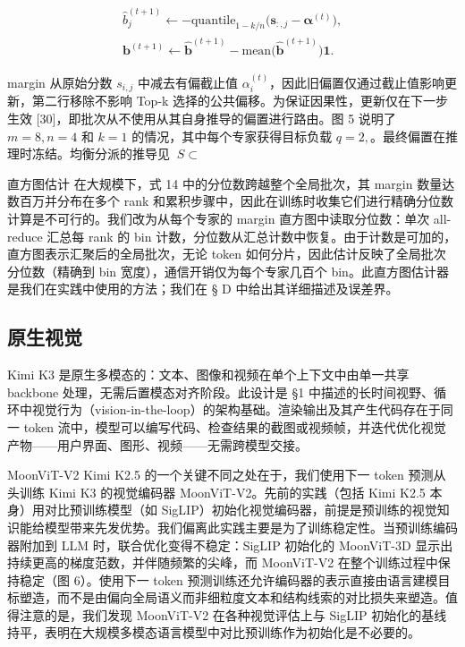 \documentclass[
  10
]{article}
\begin{document}
\[
\begin{array}{l} \widehat {b} _ {j} ^ {(t + 1)} \leftarrow - \text {quantile} _ {1 - k / n} \Big (\boldsymbol {s} _ {:, j} - \boldsymbol {\alpha} ^ {(t)} \Big), \\ \boldsymbol {b} ^ {(t + 1)} \leftarrow \widehat {\boldsymbol {b}} ^ {(t + 1)} - \text {mean} \Big (\widehat {\boldsymbol {b}} ^ {(t + 1)} \Big)   \mathbf {1}. \end{array}\tag{14}
\]

margin 从原始分数 \(s _ { i , j }\) 中减去有偏截止值 \(\alpha _ { i } ^ { ( t ) }\)，因此旧偏置仅通过截止值影响更新，第二行移除不影响 Top-k 选择的公共偏移。为保证因果性，更新仅在下一步生效 {[}30{]}，即批次从不使用从其自身推导的偏置进行路由。图 5 说明了 \(m = 8 , n = 4\) 和 \(k = 1\) 的情况，其中每个专家获得目标负载 \(q = 2 ,\)。最终偏置在推理时冻结。均衡分派的推导见 \(\ S \subset\)

直方图估计 在大规模下，式 14 中的分位数跨越整个全局批次，其 margin 数量达数百万并分布在多个 rank 和累积步骤中，因此在训练时收集它们进行精确分位数计算是不可行的。我们改为从每个专家的 margin 直方图中读取分位数：单次 all-reduce 汇总每 rank 的 bin 计数，分位数从汇总计数中恢复。由于计数是可加的，直方图表示汇聚后的全局批次，无论 token 如何分片，因此估计反映了全局批次分位数（精确到 bin 宽度），通信开销仅为每个专家几百个 bin。此直方图估计器是我们在实践中使用的方法；我们在 § D 中给出其详细描述及误差界。

\subsection{原生视觉}\label{native-vision}

Kimi K3 是原生多模态的：文本、图像和视频在单个上下文中由单一共享 backbone 处理，无需后置模态对齐阶段。此设计是 §1 中描述的长时间视野、循环中视觉行为（vision-in-the-loop）的架构基础。渲染输出及其产生代码存在于同一 token 流中，模型可以编写代码、检查结果的截图或视频帧，并迭代优化视觉产物——用户界面、图形、视频——无需跨模型交接。

MoonViT-V2 Kimi K2.5 的一个关键不同之处在于，我们使用下一 token 预测从头训练 Kimi K3 的视觉编码器 MoonViT-V2。先前的实践（包括 Kimi K2.5 本身）用对比预训练模型（如 SigLIP）初始化视觉编码器，前提是预训练的视觉知识能给模型带来先发优势。我们偏离此实践主要是为了训练稳定性。当预训练编码器附加到 LLM 时，联合优化变得不稳定：SigLIP 初始化的 MoonViT-3D 显示出持续更高的梯度范数，并伴随频繁的尖峰，而 MoonViT-V2 在整个训练过程中保持稳定（图 6）。使用下一 token 预测训练还允许编码器的表示直接由语言建模目标塑造，而不是由偏向全局语义而非细粒度文本和结构线索的对比损失来塑造。值得注意的是，我们发现 MoonViT-V2 在各种视觉评估上与 SigLIP 初始化的基线持平，表明在大规模多模态语言模型中对比预训练作为初始化是不必要的。
\end{document}
